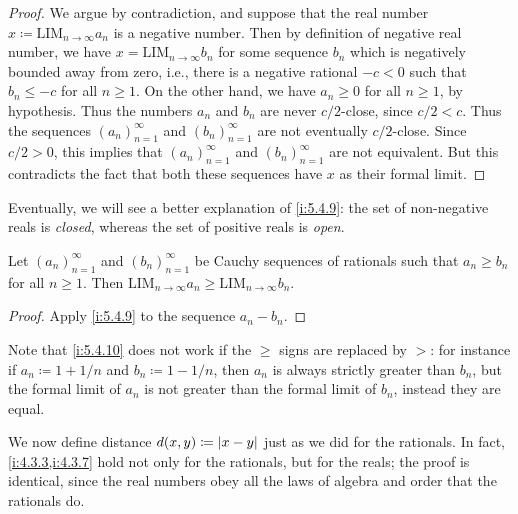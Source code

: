 \begin{proof}
  We argue by contradiction, and suppose that the real number \(x \coloneqq \text{LIM}_{n \to \infty} a_n\) is a negative number.
  Then by definition of negative real number, we have \(x = \text{LIM}_{n \to \infty} b_n\) for some sequence \(b_n\) which is negatively bounded away from zero, i.e., there is a negative rational \(-c < 0\) such that \(b_n \leq -c\) for all \(n \geq 1\).
  On the other hand, we have \(a_n \geq 0\) for all \(n \geq 1\), by hypothesis.
  Thus the numbers \(a_n\) and \(b_n\) are never \(c / 2\)-close, since \(c / 2 < c\).
  Thus the sequences \((a_n)_{n = 1}^{\infty}\) and \((b_n)_{n = 1}^{\infty}\) are not eventually \(c / 2\)-close.
  Since \(c / 2 > 0\), this implies that \((a_n)_{n = 1}^{\infty}\) and \((b_n)_{n = 1}^{\infty}\) are not equivalent.
  But this contradicts the fact that both these sequences have \(x\) as their formal limit.
\end{proof}

\begin{note}
  Eventually, we will see a better explanation of \cref{i:5.4.9}:
  the set of non-negative reals is \emph{closed}, whereas the set of positive reals is \emph{open}.
\end{note}

\begin{cor}\label{i:5.4.10}
  Let \((a_n)_{n = 1}^{\infty}\) and \((b_n)_{n = 1}^{\infty}\) be Cauchy sequences of rationals such that \(a_n \geq b_n\) for all \(n \geq 1\).
  Then \(\text{LIM}_{n \to \infty} a_n \geq \text{LIM}_{n \to \infty} b_n\).
\end{cor}

\begin{proof}
  Apply \cref{i:5.4.9} to the sequence \(a_n - b_n\).
\end{proof}

\begin{rmk}\label{i:5.4.11}
  Note that \cref{i:5.4.10} does not work if the \(\geq\) signs are replaced by \(>\):
  for instance if \(a_n \coloneqq 1 + 1 / n\) and \(b_n \coloneqq 1 - 1 / n\), then \(a_n\) is always strictly greater than \(b_n\), but the formal limit of \(a_n\) is not greater than the formal limit of \(b_n\), instead they are equal.
\end{rmk}

\begin{note}
  We now define distance \(d(x, y) \coloneqq \left\lvert x - y\right\rvert\) just as we did for the rationals.
  In fact, \cref{i:4.3.3,i:4.3.7} hold not only for the rationals, but for the reals;
  the proof is identical, since the real numbers obey all the laws of algebra and order that the rationals do.
\end{note}

